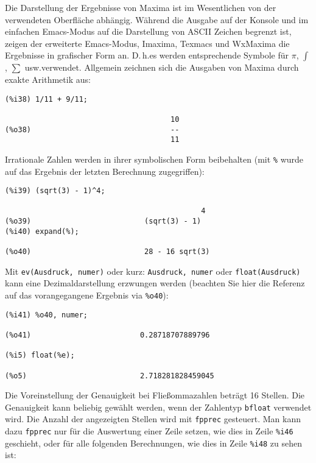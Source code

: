 \documentclass[ngerman,12pt]{scrartcl}
\begin{document}
Die Darstellung der Ergebnisse von Maxima ist im Wesentlichen von der
verwendeten Oberfläche abhängig. Während die Ausgabe auf der Konsole
und im einfachen Emacs-Modus auf die Darstellung von ASCII Zeichen
begrenzt ist, zeigen der erweiterte Emacs-Modus, Imaxima, Texmacs und
WxMaxima die Ergebnisse in grafischer Form an. D.\,h.\@ es werden
entsprechende Symbole  für $\pi$, $\int$, $\sum$ usw.\@ verwendet.
Allgemein zeichnen sich die Ausgaben von Maxima durch exakte
Arithmetik aus:

\begin{verbatim}
(%i38) 1/11 + 9/11;

                                      10
(%o38)                                --
                                      11
\end{verbatim}

Irrationale Zahlen werden in ihrer symbolischen Form beibehalten (mit
\texttt{\%} wurde auf das Ergebnis der  letzten Berechnung zugegriffen):

\begin{verbatim}
(%i39) (sqrt(3) - 1)^4;

                                             4
(%o39)                          (sqrt(3) - 1)
(%i40) expand(%);

(%o40)                          28 - 16 sqrt(3)
\end{verbatim}

Mit \texttt{ev(Ausdruck, numer)} oder kurz: \texttt{Ausdruck, numer}
oder \texttt{float(Ausdruck)} kann eine Dezimaldarstellung erzwungen
werden (beachten Sie hier die Referenz auf das vorangegangene Ergebnis
via \texttt{\%o40}):

\begin{verbatim}
(%i41) %o40, numer;

(%o41)                         0.28718707889796

(%i5) float(%e);

(%o5)                          2.718281828459045
\end{verbatim}

Die Voreinstellung der Genauigkeit bei Fließommazahlen beträgt 16
Stellen. Die Genauigkeit kann beliebig gewählt werden, wenn der
Zahlentyp \texttt{bfloat} verwendet wird. Die Anzahl der angezeigten
Stellen wird mit \texttt{fpprec} gesteuert. Man kann dazu
\texttt{fpprec} nur für die Auswertung einer Zeile setzen, wie dies in
Zeile \texttt{\%i46} geschieht, oder für alle folgenden Berechnungen,
wie dies in Zeile \texttt{\%i48} zu sehen ist:
\end{document}
